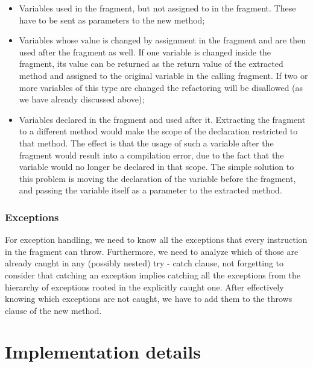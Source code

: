 \documentclass[a4paper,10pt]{article}
\begin{document}
\begin{itemize}

\item Variables used in the fragment, but not assigned to in the fragment.
These have to be sent as parameters to the new method;

\item Variables whose value is changed by assignment in the fragment
and are then used after the fragment as well. If one variable is
changed inside the fragment, its value can be returned as the return
value of the extracted method and assigned to the original variable
in the calling fragment. If two or more variables of this type are
changed the refactoring will be disallowed (as we have already
discussed above);

\item Variables declared in the fragment and used after it. Extracting the
fragment to a different method would make the scope of the declaration
restricted to that method. The effect is that the usage of such a variable
after the fragment would result into a compilation error, due to the fact
that the variable would no longer be declared in that scope. The simple
solution to this problem is moving the declaration of the variable before
the fragment, and passing the variable itself as a parameter to the extracted
method.

\end{itemize}

\subsubsection{Exceptions}
For exception handling, we need to know all the exceptions that
every instruction in the fragment can throw. Furthermore, we need to
analyze which of those are already caught in any (possibly nested) \textsf{try -
catch} clause, not forgetting to consider that catching an exception
implies catching all the exceptions from the hierarchy of exceptions
rooted in the explicitly caught one. After effectively knowing which
exceptions are not caught, we have to add them to the \textsf{throws}
clause of the new method.

\section{Implementation details}
\end{document}
